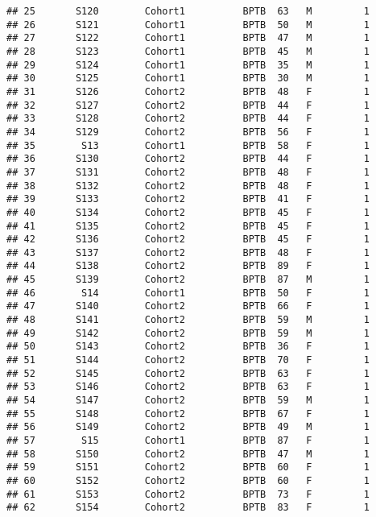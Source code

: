 \documentclass[
]{article}
\begin{document}
\begin{verbatim}
## 25       S120        Cohort1          BPTB  63   M         1      
## 26       S121        Cohort1          BPTB  50   M         1      
## 27       S122        Cohort1          BPTB  47   M         1      
## 28       S123        Cohort1          BPTB  45   M         1      
## 29       S124        Cohort1          BPTB  35   M         1      
## 30       S125        Cohort1          BPTB  30   M         1      
## 31       S126        Cohort2          BPTB  48   F         1      
## 32       S127        Cohort2          BPTB  44   F         1      
## 33       S128        Cohort2          BPTB  44   F         1      
## 34       S129        Cohort2          BPTB  56   F         1      
## 35        S13        Cohort1          BPTB  58   F         1      
## 36       S130        Cohort2          BPTB  44   F         1      
## 37       S131        Cohort2          BPTB  48   F         1      
## 38       S132        Cohort2          BPTB  48   F         1      
## 39       S133        Cohort2          BPTB  41   F         1      
## 40       S134        Cohort2          BPTB  45   F         1      
## 41       S135        Cohort2          BPTB  45   F         1      
## 42       S136        Cohort2          BPTB  45   F         1      
## 43       S137        Cohort2          BPTB  48   F         1      
## 44       S138        Cohort2          BPTB  89   F         1      
## 45       S139        Cohort2          BPTB  87   M         1      
## 46        S14        Cohort1          BPTB  50   F         1      
## 47       S140        Cohort2          BPTB  66   F         1      
## 48       S141        Cohort2          BPTB  59   M         1      
## 49       S142        Cohort2          BPTB  59   M         1      
## 50       S143        Cohort2          BPTB  36   F         1      
## 51       S144        Cohort2          BPTB  70   F         1      
## 52       S145        Cohort2          BPTB  63   F         1      
## 53       S146        Cohort2          BPTB  63   F         1      
## 54       S147        Cohort2          BPTB  59   M         1      
## 55       S148        Cohort2          BPTB  67   F         1      
## 56       S149        Cohort2          BPTB  49   M         1      
## 57        S15        Cohort1          BPTB  87   F         1      
## 58       S150        Cohort2          BPTB  47   M         1      
## 59       S151        Cohort2          BPTB  60   F         1      
## 60       S152        Cohort2          BPTB  60   F         1      
## 61       S153        Cohort2          BPTB  73   F         1      
## 62       S154        Cohort2          BPTB  83   F         1      

\end{verbatim}
\end{document}
